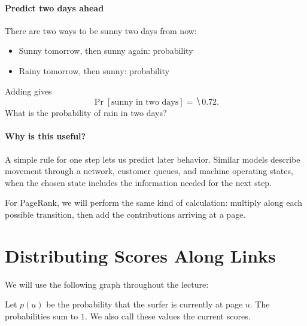 \documentclass[11pt]{article}
\begin{document}
\paragraph{Predict two days ahead}
There are two ways to be sunny two days from now:
\begin{itemize}
    \item Sunny tomorrow, then sunny again: probability 
    \item Rainy tomorrow, then sunny: probability 
\end{itemize}
Adding gives
\begin{equation*}
    \Pr[\text{sunny in two days}]=\hide{0.72}.
\end{equation*}
What is the probability of rain in two days?
\vs{.7cm}

\paragraph{Why is this useful?}
A simple rule for one step lets us predict later behavior. Similar models
describe movement through a network, customer queues, and machine operating
states, when the chosen state includes the information needed for the next step.

\vfill
For PageRank, we will perform the same kind of calculation: multiply along
each possible transition, then add the contributions arriving at a page.

\newpage
\section{Distributing Scores Along Links}
We will use the following graph throughout the lecture:
\begin{center}
\end{center}

Let $p(u)$ be the probability that the surfer is currently at page $u$.
The probabilities sum to $1$. We also call these values the current scores.
\end{document}
